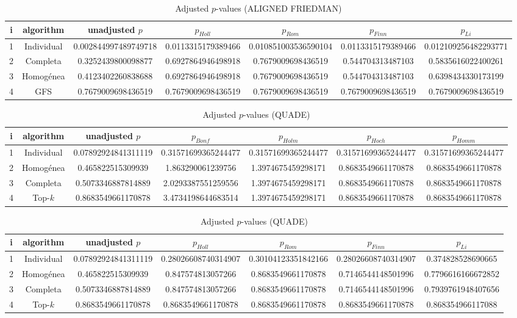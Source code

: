 \documentclass[a4paper,10pt]{article}
\begin{document}
\begin{landscape}
\begin{table}[!htp]
\centering\scriptsize
\caption{Adjusted $p$-values (ALIGNED FRIEDMAN)}
\begin{tabular}{ccccccc}
i&algorithm&unadjusted $p$&$p_{Holl}$&$p_{Rom}$&$p_{Finn}$&$p_{Li}$\\
\hline
1&Individual&0.002844997489749718&0.0113315179389466&0.010851003536590104&0.0113315179389466&0.012109256482293771\\
2&Completa&0.3252439800098877&0.6927864946498918&0.7679009698436519&0.544704313487103&0.5835616022400261\\
3&Homogénea&0.4123402260838688&0.6927864946498918&0.7679009698436519&0.544704313487103&0.6398434330173199\\
4&GFS&0.7679009698436519&0.7679009698436519&0.7679009698436519&0.7679009698436519&0.7679009698436519\\
\hline
\end{tabular}
\end{table}


\newpage

\begin{table}[!htp]
\centering\scriptsize
\caption{Adjusted $p$-values (QUADE)}
\begin{tabular}{ccccccc}
i&algorithm&unadjusted $p$&$p_{Bonf}$&$p_{Holm}$&$p_{Hoch}$&$p_{Homm}$\\
\hline
1&Individual&0.07892924841311119&0.31571699365244477&0.31571699365244477&0.31571699365244477&0.31571699365244477\\
2&Homogénea&0.465822515309939&1.863290061239756&1.3974675459298171&0.8683549661170878&0.8683549661170878\\
3&Completa&0.5073346887814889&2.0293387551259556&1.3974675459298171&0.8683549661170878&0.8683549661170878\\
4&Top-$k$&0.8683549661170878&3.4734198644683514&1.3974675459298171&0.8683549661170878&0.8683549661170878\\
\hline
\end{tabular}
\end{table}

\begin{table}[!htp]
\centering\scriptsize
\caption{Adjusted $p$-values (QUADE)}
\begin{tabular}{ccccccc}
i&algorithm&unadjusted $p$&$p_{Holl}$&$p_{Rom}$&$p_{Finn}$&$p_{Li}$\\
\hline
1&Individual&0.07892924841311119&0.28026608740314907&0.30104123351842166&0.28026608740314907&0.374828528690665\\
2&Homogénea&0.465822515309939&0.847574813057266&0.8683549661170878&0.7146544148501996&0.7796616166672852\\
3&Completa&0.5073346887814889&0.847574813057266&0.8683549661170878&0.7146544148501996&0.7939761948407656\\
4&Top-$k$&0.8683549661170878&0.8683549661170878&0.8683549661170878&0.8683549661170878&0.868354966117088\\
\hline
\end{tabular}
\end{table}

\end{landscape}
\end{document}
